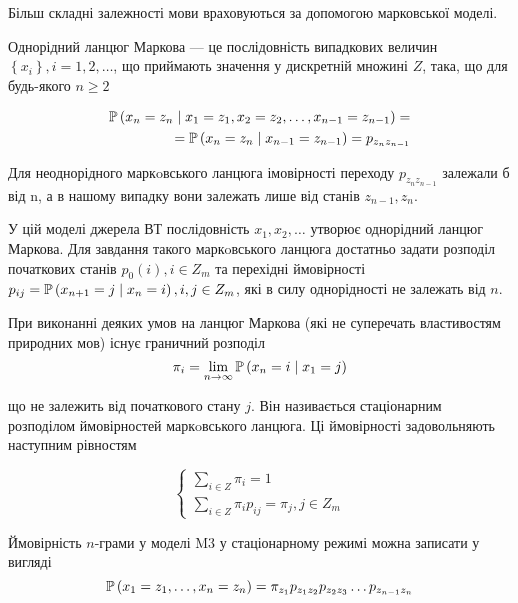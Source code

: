 Більш складні залежності мови враховуються за допомогою марковської моделі.

\begin{definition}
    Однорідний ланцюг Маркова --- це послідовність випадкових величин
    $\left\{ x_i \right\}, i=1,2,\dots$, що 
    приймають значення у дискретній множині $Z$, така,
    що для будь-якого $n \geq 2$ 

    \begin{align*}
        \mathbb{P}\left( x_n=z_n \mid x_1=z_1, x_2=z_2, \dots, x_{n-1}=z_{n-1} \right) = \\
            = \mathbb{P}\left( x_n=z_n \mid x_{n-1}=z_{n-1} \right)
            = p_{z_n z_{n-1}}
    \end{align*}

    Для неоднорідного маркoвського ланцюга імовірності переходу 
    $p_{z_n z_{n-1}}$ залежали б від n, а в нашому випадку вони залежать
    лише від станів $z_{n-1}, z_n$.

\end{definition}

\begin{definition}[Модель M3]
    У цій моделі джерела ВТ послідовність $x_1, x_2, \dots$
    утворює однорідний ланцюг Маркова.
    Для завдання такого маркoвського ланцюга достатньо задати
    розподіл початкових станів  $p_0\left( i \right), i \in Z_m$
    та перехідні ймовірності
    $p_{ij}=\mathbb{P}\left( x_{n+1}=j \mid x_n=i \right), i, j\in Z_m$,
    які в силу однорідності не залежать від  $n$.
    
    При виконанні деяких умов на ланцюг Маркова (які не суперечать  властивостям
    природних мов) існує граничний розподіл
    $$\pi_i=\lim_{n \to \infty} \mathbb{P}\left( x_n=i \mid x_1=j \right)$$

    що не залежить від початкового стану  $j$. Він називається стаціонарним
    розподілом ймовірностей маркoвського ланцюга. Ці ймовірності задовольняють
    наступним рівностям

    $$\begin{cases}
        \sum_{i \in Z} \pi_i = 1 \\
        \sum_{i \in Z} \pi_i p_{ij} = \pi_j, j \in Z_m
    \end{cases}$$

    Ймовірність $n$-грами у моделі M3 у стаціонарному режимі
    можна записати у вигляді
    $$\mathbb{P}\left( x_1=z_1, \dots, x_n=z_n \right)
        = \pi_{z_1} p_{z_1 z_2} p_{z_2 z_3} \dots p_{z_{n-1} z_n}$$
\end{definition}

